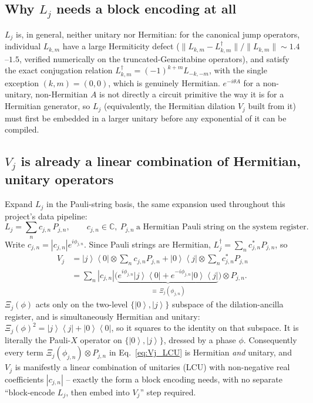 \documentclass[11pt]{article}
\renewcommand{\ket}[1]{\left| #1 \right\rangle}
\renewcommand{\bra}[1]{\left\langle #1 \right|}
\begin{document}
\subsection{Why \texorpdfstring{$L_j$}{Lj} needs a block encoding at all}
$L_j$ is, in general, neither unitary nor Hermitian: for the canonical jump operators, individual $L_{k,m}$ have a large Hermiticity defect ($\|L_{k,m}-L_{k,m}^\dagger\|/\|L_{k,m}\|\sim1.4$--$1.5$, verified numerically on the truncated-Gemcitabine operators), and satisfy the exact conjugation relation $L_{k,m}^\dagger=(-1)^{k+m}L_{-k,-m}$, with the single exception $(k,m)=(0,0)$, which is genuinely Hermitian. $e^{-i\theta A}$ for a non-unitary, non-Hermitian $A$ is not directly a circuit primitive the way it is for a Hermitian generator, so $L_j$ (equivalently, the Hermitian dilation $V_j$ built from it) must first be embedded in a larger unitary before any exponential of it can be compiled.

\subsection{\texorpdfstring{$V_j$}{Vj} is already a linear combination of Hermitian, unitary operators}
Expand $L_j$ in the Pauli-string basis, the same expansion used throughout this project's data pipeline:
\begin{equation}
    L_j = \sum_n c_{j,n}\,P_{j,n},\qquad c_{j,n}\in\mathbb{C},\ P_{j,n}\ \text{a Hermitian Pauli string on the system register}.
\end{equation}
Write $c_{j,n}=|c_{j,n}|e^{i\phi_{j,n}}$. Since Pauli strings are Hermitian, $L_j^\dagger=\sum_nc_{j,n}^*P_{j,n}$, so
\begin{align}
    V_j &= \ket{j}\bra{0}\otimes\sum_nc_{j,n}P_{j,n} + \ket{0}\bra{j}\otimes\sum_nc_{j,n}^*P_{j,n}\\
    &= \sum_n|c_{j,n}|\Big(\underbrace{e^{i\phi_{j,n}}\ket{j}\bra{0}+e^{-i\phi_{j,n}}\ket{0}\bra{j}}_{\equiv\,\Xi_j(\phi_{j,n})}\Big)\otimes P_{j,n}.
    \label{eq:Vj_LCU}
\end{align}
$\Xi_j(\phi)$ acts only on the two-level $\{\ket0,\ket j\}$ subspace of the dilation-ancilla register, and is simultaneously Hermitian and unitary: $\Xi_j(\phi)^2=\ket j\bra j+\ket0\bra0$, so it squares to the identity on that subspace. It is literally the Pauli-$X$ operator on $\{\ket0,\ket j\}$, dressed by a phase $\phi$. Consequently every term $\Xi_j(\phi_{j,n})\otimes P_{j,n}$ in Eq.~\eqref{eq:Vj_LCU} is Hermitian \emph{and} unitary, and $V_j$ is manifestly a linear combination of unitaries (LCU) with non-negative real coefficients $|c_{j,n}|$ -- exactly the form a block encoding needs, with no separate ``block-encode $L_j$, then embed into $V_j$'' step required.
\end{document}
